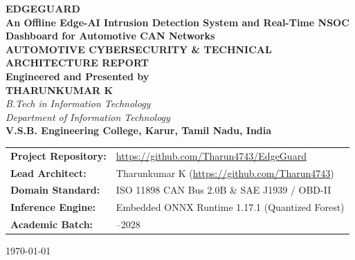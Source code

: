 \documentclass[12pt,a4paper]{report}
\begin{document}
\begin{titlepage}
    \centering
    \vspace*{0.8cm}
    
    {\Huge \textbf{EDGEGUARD}}\\[0.3cm]
    {\LARGE \textbf{An Offline Edge-AI Intrusion Detection System and Real-Time NSOC Dashboard for Automotive CAN Networks}}\\[1.2cm]
    
    {\large \textbf{AUTOMOTIVE CYBERSECURITY \& TECHNICAL ARCHITECTURE REPORT}}\\[1.0cm]
    
    \textbf{Engineered and Presented by}\\[0.3cm]
    {\Large \textbf{THARUNKUMAR K}}\\[0.2cm]
    \textit{B.Tech in Information Technology}\\[0.1cm]
    \textit{Department of Information Technology}\\[0.2cm]
    \textbf{V.S.B. Engineering College, Karur, Tamil Nadu, India}\\[1.5cm]
    
    \vfill
    
    \begin{tabular}{>{\raggedright\arraybackslash\bfseries}p{4.2cm}>{\raggedright\arraybackslash}p{10.2cm}}
        Project Repository: & \url{https://github.com/Tharun4743/EdgeGuard} \\
        Lead Architect: & Tharunkumar K (\url{https://github.com/Tharun4743}) \\
        Domain Standard: & ISO 11898 CAN Bus 2.0B \& SAE J1939 / OBD-II \\
        Inference Engine: & Embedded ONNX Runtime 1.17.1 (Quantized Forest) \\
        Academic Batch: & 2024--2028 \\
    \end{tabular}
    
    \vspace*{0.8cm}
    {\small \today}
\end{titlepage}

\cleardoublepage
{}
\setcounter{page}{1}
\end{document}
